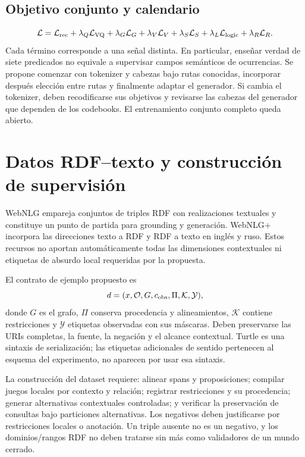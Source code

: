 \documentclass[11pt,a4paper]{article}
\newcommand{\loss}{\mathcal{L}}
\newcommand{\KB}{\mathcal{K}}
\begin{document}
\subsection{Objetivo conjunto y calendario}
\begin{equation}
 \loss=\loss_{\rm rec}+\lambda_Q\loss_{\rm VQ}
 +\lambda_G\loss_G+\lambda_V\loss_V+\lambda_S\loss_S
 +\lambda_L\loss_{\rm logic}+\lambda_R\loss_R.
\end{equation}
Cada término corresponde a una señal distinta. En particular, enseñar verdad
de siete predicados no equivale a supervisar campos semánticos de ocurrencias.
Se propone comenzar con tokenizer y cabezas bajo rutas conocidas, incorporar
después elección entre rutas y finalmente adaptar el generador. Si cambia el
tokenizer, deben recodificarse sus objetivos y revisarse las cabezas del generador
que dependen de los codebooks. El entrenamiento conjunto completo queda abierto.

\section{Datos RDF--texto y construcción de supervisión}
WebNLG empareja conjuntos de triples RDF con realizaciones textuales y constituye
un punto de partida para grounding y generación\cite{webnlg}. WebNLG+ incorpora
las direcciones texto a RDF y RDF a texto en inglés y ruso\cite{webnlgplus}.
Estos recursos no aportan automáticamente todas las dimensiones contextuales
ni etiquetas de absurdo local requeridas por la propuesta.

El contrato de ejemplo propuesto es
\begin{equation}
 d=(x,\mathcal{O},G,c_{\rm obs},\Pi,\KB,\mathcal{Y}),
\end{equation}
donde $G$ es el grafo, $\Pi$ conserva procedencia y alineamientos, $\KB$ contiene
restricciones y $\mathcal{Y}$ etiquetas observadas con sus máscaras. Deben
preservarse las URIs completas, la fuente, la negación y el alcance contextual.
Turtle es una sintaxis de serialización; las etiquetas adicionales de sentido
pertenecen al esquema del experimento, no aparecen por usar esa sintaxis.

La construcción del dataset requiere: alinear spans y proposiciones; compilar
juegos locales por contexto y relación; registrar restricciones y su procedencia;
generar alternativas contextuales controladas; y verificar la preservación de
consultas bajo particiones alternativas. Los negativos deben justificarse por
restricciones locales o anotación. Un triple ausente no es un negativo, y los
dominios/rangos RDF no deben tratarse sin más como validadores de un mundo cerrado.
\end{document}
